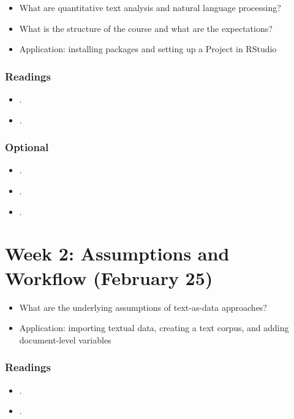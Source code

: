 \documentclass[abstract=on,parskip=full,headings=standardclasses,fontsize=11pt,paper=a4]{scrartcl}
\begin{document}
\begin{itemize}
\item What are quantitative text analysis and natural language processing?
\item What is the structure of the course and what are the expectations?
\item Application: installing packages and setting up a Project in RStudio
\end{itemize}

\subsubsection*{Readings}
\begin{itemize}
\item {}.
\item {}.
\end{itemize}

\subsubsection*{Optional}
\begin{itemize}
\item {}.
\item {}.
\item {}.
\end{itemize}


\section{Week 2: Assumptions and  Workflow (February 25)}

\begin{itemize}
\item What are the underlying assumptions of text-as-data approaches?
\item Application: importing textual data, creating a text corpus, and adding document-level variables
\end{itemize}

\subsubsection*{Readings}
\begin{itemize}
\item {}.
\item {}.
\end{itemize}
\end{document}
